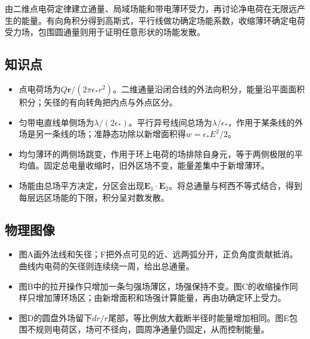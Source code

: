 \documentclass[UTF8,fontset=fandol,a4paper,11pt]{ctexart}
\begin{document}
由二维点电荷定律建立通量、局域场能和带电薄环受力，再讨论净电荷在无限远产生的能量。有向角积分得到高斯式，平行线做功确定场能系数，收缩薄环确定电荷受力场，包围圆通量则用于证明任意形状的场能发散。



\subsection*{知识点}

\begin{itemize}
\item 点电荷场为$Q\boldsymbol r/(2\pi\epsilon_*r^2)$。二维通量沿闭合线的外法向积分，能量沿平面面积积分；矢径的有向转角把内点与外点区分。
\item 匀带电直线单侧场为$\lambda/(2\epsilon_*)$。平行异号线间总场为$\lambda/\epsilon_*$，作用于某条线的外场是另一条线的场；准静态功除以新增面积得$w=\epsilon_*E^2/2$。
\item 均匀薄环的两侧场跳变，作用于环上电荷的场排除自身元，等于两侧极限的平均值。固定总电量收缩时，旧外区场不变，能量差集中于新增薄环。
\item 场能由总场平方决定，分区会出现$\boldsymbol E_1\cdot\boldsymbol E_2$。将总通量与柯西不等式结合，得到每层远区场能的下限，积分呈对数发散。
\end{itemize}



\subsection*{物理图像}

\begin{itemize}
\item 图A画外法线和矢径；F把外点可见的近、远两弧分开，正负角度贡献抵消。曲线内电荷的矢径则连续绕一周，给出总通量。
\item 图B中的拉开操作只增加一条匀强场薄区，场强保持不变。图C的收缩操作同样只增加薄环场区；由新增面积和场强计算能量，再由功确定环上受力。
\item 图D的圆盘外场留下$dr/r$尾部，等比例放大截断半径时能量增加相同。图E包围不规则电荷区，场可不径向，圆周净通量仍固定，从而控制能量。
\end{itemize}


\end{document}
